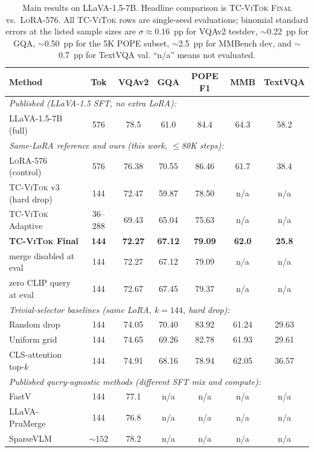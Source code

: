 \documentclass[runningheads]{llncs}
\begin{document}
\begin{table}[t]
\caption{Main results on LLaVA-1.5-7B. Headline comparison is
\textsc{TC-ViTok Final} vs.\ \textsc{LoRA-576}. All \textsc{TC-ViTok}
rows are single-seed evaluations; binomial standard errors at the
listed sample sizes are $\sigma{\approx}0.16$~pp for VQAv2 testdev,
$\sim$0.22~pp for GQA, $\sim$0.50~pp for the 5K POPE subset,
$\sim$2.5~pp for MMBench dev, and $\sim$0.7~pp for TextVQA val.
``n/a'' means not evaluated.}
\label{tab:main}
\centering
\small
\renewcommand{\arraystretch}{1.05}
\setlength{\tabcolsep}{2.5pt}
\begin{tabular}{lcccccc}
\toprule
\textbf{Method} & \textbf{Tok} & \textbf{VQAv2} & \textbf{GQA} & \textbf{POPE F1} & \textbf{MMB} & \textbf{TextVQA} \\
\midrule
\multicolumn{7}{l}{\emph{Published (LLaVA-1.5 SFT, no extra LoRA):}} \\
LLaVA-1.5-7B (full)~\cite{liu2024llava} & 576 & 78.5 & 61.0 & 84.4 & 64.3 & 58.2 \\
\midrule
\multicolumn{7}{l}{\emph{Same-LoRA reference and ours (this work, $\le$80K steps):}} \\
\textsc{LoRA-576} (control)         & 576       & 76.38 & 70.55 & 86.46 & 61.7 & 38.4 \\
\textsc{TC-ViTok} v3 (hard drop)    & 144       & 72.47 & 59.87 & 78.50 & n/a & n/a \\
\textsc{TC-ViTok} Adaptive          & 36--288   & 69.43 & 65.04 & 75.63 & n/a & n/a \\
\textbf{\textsc{TC-ViTok} Final}    & \textbf{144} & \textbf{72.27} & \textbf{67.12} & \textbf{79.09} & \textbf{62.0} & \textbf{25.8} \\
\quad merge disabled at eval        & 144       & 72.27 & 67.12 & 79.09 & n/a & n/a \\
\quad zero CLIP query at eval       & 144       & 72.67 & 67.45 & 79.37 & n/a & n/a \\
\midrule
\multicolumn{7}{l}{\emph{Trivial-selector baselines (same LoRA, $k{=}144$, hard drop):}} \\
Random drop                         & 144       & 74.05 & 70.40 & 83.92 & 61.24 & 29.63 \\
Uniform grid                        & 144       & 74.65 & 69.26 & 82.78 & 61.93 & 29.61 \\
CLS-attention top-$k$               & 144       & 74.91 & 68.16 & 78.94 & 62.05 & 36.57 \\
\midrule
\multicolumn{7}{l}{\emph{Published query-agnostic methods (different SFT mix and compute):}} \\
FastV~\cite{chen2024fastv}              & 144       & 77.1 & n/a & n/a & n/a & n/a \\
LLaVA-PruMerge~\cite{shang2024llava}    & 144       & 76.8 & n/a & n/a & n/a & n/a \\
SparseVLM~\cite{zhang2025sparsevlm}     & ${\sim}152$ & 78.2 & n/a & n/a & n/a & n/a \\
\bottomrule
\end{tabular}
\end{table}
\end{document}
